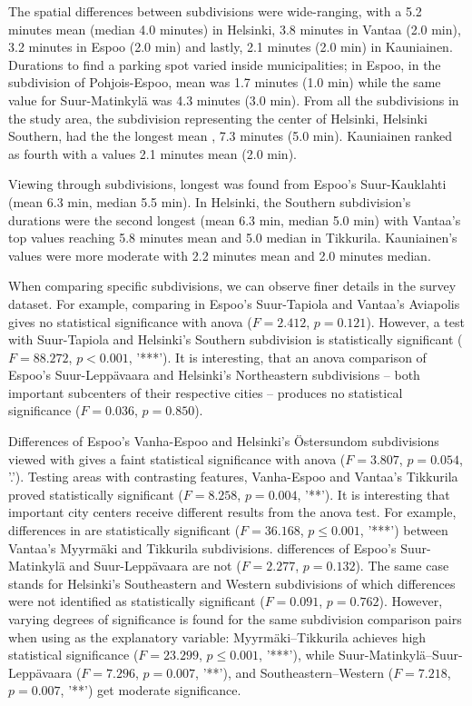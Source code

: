 The spatial differences between subdivisions were wide-ranging, with a 5.2 minutes mean (median 4.0 minutes)  in Helsinki, 3.8 minutes in Vantaa (2.0 min), 3.2 minutes in Espoo (2.0 min) and lastly, 2.1 minutes (2.0 min) in Kauniainen. Durations to find a parking spot varied inside municipalities; in Espoo, in the subdivision of Pohjois-Espoo, mean  was 1.7 minutes (1.0 min) while the same value for Suur-Matinkylä was 4.3 minutes (3.0 min). From all the subdivisions in the study area, the subdivision representing the center of Helsinki, Helsinki Southern, had the the longest mean , 7.3 minutes (5.0 min). Kauniainen ranked as fourth with a  values 2.1 minutes mean (2.0 min).

Viewing  through subdivisions, longest  was found from Espoo's Suur-Kauklahti (mean 6.3 min, median 5.5 min). In Helsinki, the Southern subdivision's durations were the second longest (mean 6.3 min, median 5.0 min) with Vantaa's top values reaching 5.8 minutes mean and 5.0 median in Tikkurila. Kauniainen's  values were more moderate with 2.2 minutes mean and 2.0 minutes median.

When comparing specific subdivisions, we can observe finer details in the survey dataset. For example, comparing  in Espoo's Suur-Tapiola and Vantaa's Aviapolis gives no statistical significance with \acrshort{anova} ($F = 2.412$, $p = 0.121$). However, a test with Suur-Tapiola and Helsinki's Southern subdivision is statistically significant ($F = 88.272$, $p < 0.001$, ’***’). It is interesting, that an \acrshort{anova}  comparison of Espoo's Suur-Leppävaara and Helsinki's Northeastern subdivisions -- both important subcenters of their respective cities -- produces no statistical significance ($F = 0.036$, $p = 0.850$). 

Differences of Espoo's Vanha-Espoo and Helsinki's Östersundom subdivisions viewed with  gives a faint statistical significance with \acrshort{anova} ($F = 3.807$, $p = 0.054$, '.'). Testing areas with contrasting features, Vanha-Espoo and Vantaa's Tikkurila proved statistically significant ($F = 8.258$, $p = 0.004$, '**'). It is interesting that important city centers receive different results from the \acrshort{anova} test. For example, differences in  are statistically significant ($F = 36.168$, $p \leq 0.001$, ’***’) between Vantaa's Myyrmäki and Tikkurila subdivisions.  differences of Espoo's Suur-Matinkylä and Suur-Leppävaara are not ($F = 2.277$, $p = 0.132$). The same case stands for Helsinki's Southeastern and Western subdivisions of which differences were not identified as statistically significant ($F = 0.091$, $p = 0.762$). However, varying degrees of significance is found for the same subdivision comparison pairs when using  as the explanatory variable: Myyrmäki--Tikkurila achieves high statistical significance ($F = 23.299$, $p \leq 0.001$, ’***’), while Suur-Matinkylä--Suur-Leppävaara ($F = 7.296$, $p = 0.007$, '**'), and Southeastern--Western ($F = 7.218$, $p = 0.007$, '**') get moderate significance.

